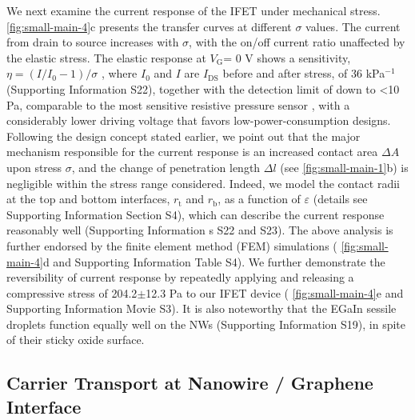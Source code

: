 We next examine the current response of the IFET under mechanical
stress.  \autoref{fig:small-main-4}c presents the transfer curves at
different \(\sigma\) values. The current from drain to source
increases with \(\sigma\), with the on/off current ratio unaffected by
the elastic stress. The elastic response at \(V_{\mathrm{G}}\)= 0 V
shows a sensitivity, \(\eta = (I/I_{0} - 1) / \sigma\) , where
\(I_{0}\) and \(I\) are \(I_{\mathrm{DS}}\) before and after stress,
of 36 kPa\(^{-1}\) (Supporting Information  S22), together with
the detection limit of down to \textless{}10 Pa, comparable to the
most sensitive resistive pressure sensor
\cite{Mannsfeld_2010_pressure,Pang_2012_gauge,Pan_2014_pressure,Zang_2015_suspend_gate_FET},
with a considerably lower driving voltage that favors
low-power-consumption designs. Following the design concept stated
earlier, we point out that the major mechanism responsible for the
current response is an increased contact area \(\Delta A\) upon stress
\(\sigma\), and the change of penetration length \(\Delta l\) (see
 \autoref{fig:small-main-1}b) is negligible within the stress range
considered. Indeed, we model the contact radii at the top and bottom
interfaces, \(r_{\mathrm{t}}\) and \(r_{\mathrm{b}}\), as a function
of \(\varepsilon\) (details see Supporting Information Section S4),
which can describe the current response reasonably well (Supporting
Information s S22 and S23). The above analysis is further
endorsed by the finite element method (FEM) simulations (
\autoref{fig:small-main-4}d and Supporting Information Table S4).  We further
demonstrate the reversibility of current response by repeatedly
applying and releasing a compressive stress of 204.2\(\pm\)12.3 Pa to
our IFET device ( \autoref{fig:small-main-4}e and Supporting Information
Movie S3). It is also noteworthy that the EGaIn sessile droplets
function equally well on the NWs (Supporting Information  S19),
in spite of their sticky oxide surface.

\subsection{Carrier Transport at Nanowire / Graphene Interface}
\label{sec:small-carrier-transport}



